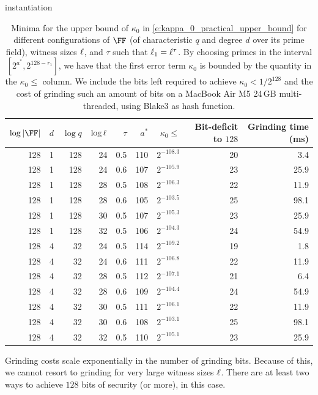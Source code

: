 \begin{lncsappendix}{instantiation}
   \begin{table}[H]
  \centering
 \begin{tabular}{rrrrrrrrr}
    \toprule
    $\log |\FF|$ & $d$ & $\log q$ & $\log \ell$ & $\tau$ & $a^{*}$ & $\kappa_0\leq$ & Bit-deficit to $128$ & Grinding time (ms) \\
    \midrule
    128 & 1 & 128 & 24 & 0.5 & 110 & $2^{-108.3}$ & 20 & 3.4 \\
    128 & 1 & 128 & 24 & 0.6 & 107 & $2^{-105.9}$ & 23 & 25.9 \\
    128 & 1 & 128 & 28 & 0.5 & 108 & $2^{-106.3}$ & 22 & 11.9 \\
    128 & 1 & 128 & 28 & 0.6 & 105 & $2^{-103.5}$ & 25 & 98.1 \\
    128 & 1 & 128 & 30 & 0.5 & 107 & $2^{-105.3}$ & 23 & 25.9 \\
    128 & 1 & 128 & 32 & 0.5 & 106 & $2^{-104.3}$ & 24 & 54.9 \\
    \midrule
    128 & 4 & 32 & 24 & 0.5 & 114 & $2^{-109.2}$ & 19 & 1.8 \\
    128 & 4 & 32 & 24 & 0.6 & 111 & $2^{-106.8}$ & 22 & 11.9 \\
    128 & 4 & 32 & 28 & 0.5 & 112 & $2^{-107.1}$ & 21 & 6.4 \\
    128 & 4 & 32 & 28 & 0.6 & 109 & $2^{-104.4}$ & 24 & 54.9 \\
    128 & 4 & 32 & 30 & 0.5 & 111 & $2^{-106.1}$ & 22 & 11.9 \\
    128 & 4 & 32 & 30 & 0.6 & 108 & $2^{-103.1}$ & 25 & 98.1 \\
    128 & 4 & 32 & 32 & 0.5 & 110 & $2^{-105.1}$ & 23 & 25.9 \\
    \bottomrule
  \end{tabular}  \caption{Minima for the upper bound of $\kappa_0$ in \eqref{e:kappa_0_practical_upper_bound} for different configurations of $\FF$ (of characteristic $q$ and  degree $d$ over its prime field), witness sizes $\ell$, and $\tau$ such that $\ell_1=\ell^\tau$.  By choosing primes in the interval $[2^{a^*}, 2^{128-r_1}]$, we have that the first error term $\kappa_0$ is bounded by the quantity in the $\kappa_0\leq$ column. We include the bits left required to achieve  $\kappa_0 < 1/2^{128}$ and the cost of grinding such an amount of bits on a MacBook Air M5 24\,GB multi-threaded, using Blake3 as hash function.}
  \label{tab:min-f}
\end{table}


\begin{remark}\label{r:beyond_gridning}
    Grinding costs scale exponentially in the number of grinding bits. Because of this, we cannot resort to grinding for very large witness sizes $\ell$. There are at least two ways to achieve $128$ bits of security (or more), in this case.


\end{remark}
\end{lncsappendix}
